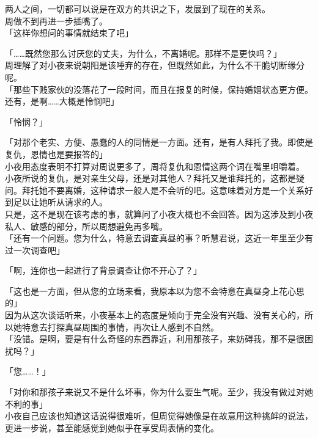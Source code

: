 两人之间，一切都可以说是在双方的共识之下，发展到了现在的关系。\\

周做不到再进一步插嘴了。\\

「这样你想问的事情就结束了吧」

「……既然您那么讨厌您的丈夫，为什么，不离婚呢。那样不是更快吗？」\\

周理解了对小夜来说朝阳是该唾弃的存在，但既然如此，为什么不干脆切断缘分呢。\\

「那些下贱家伙的没落花了一段时间，而且在报复的时候，保持婚姻状态更方便。还有，是啊……大概是怜悯吧」

「怜悯？」

「对那个老实、方便、愚蠢的人的同情是一方面。还有，是有人拜托了我。即使是复仇，恩情也是要报答的」\\

小夜用态度表明不打算对周说更多了，周将复仇和恩情这两个词在嘴里咀嚼着。\\

小夜所说的复仇，是对亲生父母，还是对其他人？拜托又是谁拜托的，这都是疑问。拜托她不要离婚，这种请求一般人是不会听的吧。这意味着对方是一个关系好到足以让她听从请求的人。\\

只是，这不是现在该考虑的事，就算问了小夜大概也不会回答。因为这涉及到小夜私人、敏感的部分，所以周想避免再多嘴。\\

「还有一个问题。您为什么，特意去调查真昼的事？听慧君说，这近一年里至少有过一次调查吧」

「啊，连你也一起进行了背景调查让你不开心了？」

「这也是一方面，但从您的立场来看，我原本以为您不会特意在真昼身上花心思的」\\

因为从这次谈话听来，小夜基本上的态度是倾向于完全没有兴趣、没有关心的，所以她特意去打探真昼周围的事情，再次让人感到不自然。\\

「没错。是啊，要是有什么奇怪的东西靠近，利用那孩子，来妨碍我，那不是很困扰吗？」

「您……！」

「对你和那孩子来说又不是什么坏事，你为什么要生气呢。至少，我没有做过对她不利的事」\\

小夜自己应该也知道这话说得很难听，但周觉得她像是在故意用这种挑衅的说法，更进一步说，甚至能感觉到她似乎在享受周表情的变化。

